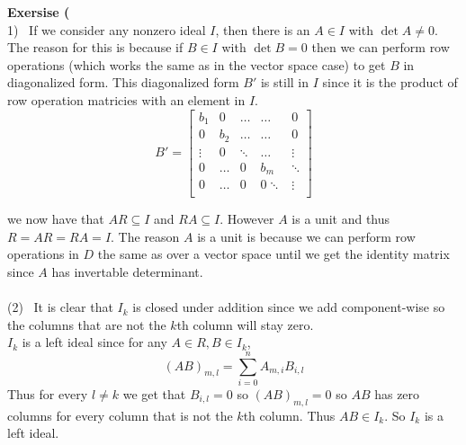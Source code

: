 \documentclass[12pt]{article}
\newenvironment{ques}[1]{\textbf{Exersise #1}\vspace{1 mm}\\ }{\bigskip}
\theoremstyle{definition}
\begin{document}
\begin{ques}{7.6}
	(1) \ If we consider any nonzero ideal $I$, then there is an $A \in I$ with
	$\det A \neq 0$. The reason for this is because if $B \in I$ with $\det B =
	0$ then we can perform row operations (which works the same as in
	the vector space case) to get $B$ in diagonalized form. This diagonalized
	form $B'$ is still in $I$ since it is the product of row operation
	matricies with an element in $I$. 
	$$B' = \begin{bmatrix}
	b_1 & 0 & \dots & \dots &0\\
	0 & b_2 & \dots & \dots &0\\
	\vdots & 0 & \ddots &\dots & \vdots\\
	0& \dots & 0 & b_m &  \ddots\\
	0 & \dots & 0 & 0 \ddots & \vdots\\
	\end{bmatrix}
	$$
	
	we now have that $AR \subseteq I$ and $RA \subseteq I$. However $A$ is a
	unit and thus $R = AR = RA = I$. The reason $A$ is a unit is because we can
	perform row operations in $D$ the same as over a vector space until we get
	the identity matrix since $A$ has invertable determinant.\\
	\\
	(2) \ It is clear that $I_k$ is closed under addition since we add
	component-wise so the columns that are not the $k$th column will stay zero.\\
	$I_k$ is a left ideal since for any $A \in R, B \in I_k$, 
	$$(AB)_{m,l} = \sum_{i = 0}^n A_{m,i}B_{i,l}$$
	Thus for every $l \neq k$ we get that $B_{i,l} = 0$ so $(AB)_{m,l} = 0$ so
	$AB$ has zero columns for every column that is not the $k$th column. Thus
	$AB \in I_k$. So $I_k$ is a left ideal.
\end{ques}
\end{document}
